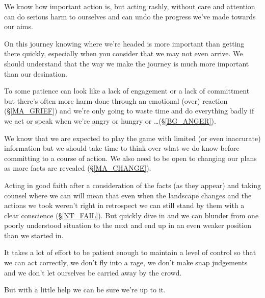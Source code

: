 \cleardoublepage
{ \small
We know how important action is, but acting rashly, without care and attention can do serious harm to ourselves and can undo the progress we've made towards our aims.

On this journey knowing where we're headed is more important than getting there quickly, especially when you consider that we may not even arrive. We should understand that the way we make the journey is much more important than our desination.

To some patience can look like a lack of engagement or a lack of committment but there's often more harm done through an emotional (over) reaction (\S \ref{MA_GRIEF}) and we're only going to waste time and do everything badly if we act or speak when we're angry or hungry or \ldots (\S \ref{BG_ANGER}).

We know that we are expected to play the game with limited (or even inaccurate) information but we should take time to think over what we do know before committing to a course of action. We also need to be open to changing our plans as more facts are revealed (\S \ref{MA_CHANGE}).  

Acting in good faith after a consideration of the facts (as they appear) and taking counsel where we can will mean that even when the landscape changes and the actions we took weren't right in retrospect we can still stand by them with a clear conscience (\S \ref{NT_FAIL}). But quickly dive in and we can blunder from one poorly understood situation to the next and end up in an even weaker position than we started in. 

It takes a lot of effort to be patient enough to maintain a level of control so that we can act correctly, we don't fly into a rage, we don't make snap judgements and we don't let ourselves be carried away by the crowd.

But with a little help we can be sure we're up to it.
}

